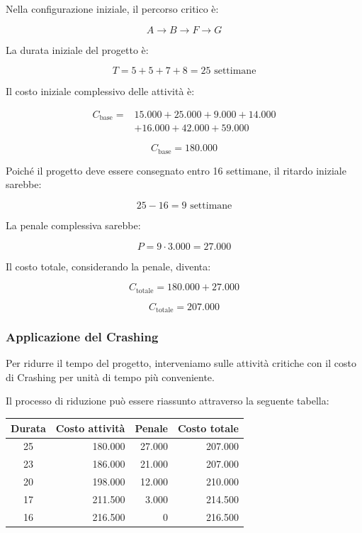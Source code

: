 \noindent Nella configurazione iniziale, il percorso critico è:

\[
\boxed{A\rightarrow B\rightarrow F\rightarrow G}
\]

\noindent La durata iniziale del progetto è:

\[
T=5+5+7+8=\boxed{25\text{ settimane}}
\]

\noindent Il costo iniziale complessivo delle attività è:

\[
\begin{aligned}
C_{\text{base}}={}&15.000+25.000+9.000+14.000\\
&+16.000+42.000+59.000
\end{aligned}
\]

\[
\boxed{C_{\text{base}}=180.000}
\]

\noindent Poiché il progetto deve essere consegnato entro
16 settimane, il ritardo iniziale sarebbe:

\[
25-16=9\text{ settimane}
\]

\noindent La penale complessiva sarebbe:

\[
P=9\cdot3.000=\boxed{27.000}
\]

\noindent Il costo totale, considerando la penale, diventa:

\[
C_{\text{totale}}=180.000+27.000
\]

\[
\boxed{C_{\text{totale}}=207.000}
\]


\subsubsection*{Applicazione del Crashing}

\noindent Per ridurre il tempo del progetto, interveniamo
sulle attività critiche con il costo di Crashing
per unità di tempo più conveniente.

\medskip

\noindent Il processo di riduzione può essere riassunto
attraverso la seguente tabella:

\begin{center}
\renewcommand{\arraystretch}{1.2}
\begin{tabular}{|c|r|r|r|}
\hline
\textbf{Durata} &
\textbf{Costo attività} &
\textbf{Penale} &
\textbf{Costo totale} \\
\hline
25 & 180.000 & 27.000 & 207.000 \\ \hline
23 & 186.000 & 21.000 & 207.000 \\ \hline
20 & 198.000 & 12.000 & 210.000 \\ \hline
17 & 211.500 & 3.000  & 214.500 \\ \hline
16 & 216.500 & 0      & 216.500 \\ \hline
\end{tabular}
\end{center}

